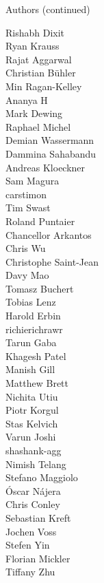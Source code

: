 \documentclass[xcolor=svgnames]{beamer}
\begin{document}
\begin{frame}{Authors (continued)}
\begin{multicols}{5}
        Rishabh Dixit\\
        Ryan Krauss\\
        Rajat Aggarwal\\
        Christian Bühler\\
        Min Ragan-Kelley\\
        Ananya H\\
        Mark Dewing\\
        Raphael Michel\\
        Demian Wassermann\\
        Dammina Sahabandu\\
        Andreas Kloeckner\\
        Sam Magura\\
        carstimon\\
        Tim Swast\\
        Roland Puntaier\\
        Chancellor Arkantos\\
        Chris Wu\\
        Christophe Saint-Jean\\
        Davy Mao\\
        Tomasz Buchert\\
        Tobias Lenz\\
        Harold Erbin\\
        richierichrawr\\
        Tarun Gaba\\
        Khagesh Patel\\
        Manish Gill\\
        Matthew Brett\\
        Nichita Utiu\\
        Piotr Korgul\\
        Stas Kelvich\\
        Varun Joshi\\
        shashank-agg\\
        Nimish Telang\\
        Stefano Maggiolo\\
        Óscar Nájera\\
        Chris Conley\\
        Sebastian Kreft\\
        Jochen Voss\\
        Stefen Yin\\
        Florian Mickler\\
        Tiffany Zhu\\

\end{multicols}
\end{frame}
\end{document}

